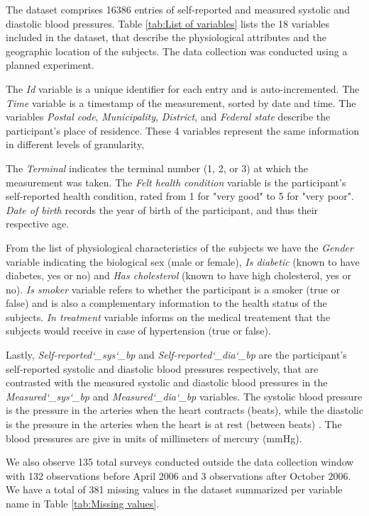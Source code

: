 \documentclass[12 pt]{scrartcl}
\numberwithin{equation}{section}
\begin{document}
The dataset comprises 16386 entries of self-reported and measured systolic and diastolic blood pressures. 
Table \ref{tab:List of variables} lists the 18 variables included in the dataset,
that describe the physiological attributes and the geographic location of the subjects. 
The data collection was conducted using a planned experiment.

The \textit{Id} variable is a unique identifier for each entry and is auto-incremented.
The \textit{Time} variable is a timestamp of the measurement, sorted by date and time.
The variables \textit{Postal code}, \textit{Municipality}, \textit{District}, and \textit{Federal state} describe the participant's place of residence.
These 4 variables represent the same information in different levels of granularity, 

The \textit{Terminal} indicates the terminal number (1, 2, or 3) at which the measurement was taken.
The \textit{Felt health condition} variable is the participant's self-reported health condition, rated from 1 for "very good" to 5 for "very poor".
\textit{Date of birth} records the year of birth of the participant, and thus their respective age.

From the list of physiological characteristics of the subjects we have the \textit{Gender} variable 
indicating the biological sex (male or female), 
\textit{Is diabetic} (known to have diabetes, yes or no) and \textit{Has cholesterol} (known to have high cholesterol, yes or no).
\textit{Is smoker} variable refers to whether the participant is a smoker (true or false)
and is also a complementary information to the health status of the subjects.
\textit{In treatment} variable informs on the medical treatement that the subjects would receive in case of hypertension (true or false).

Lastly, \textit{Self-reported\char`_sys\char`_bp} and \textit{Self-reported\char`_dia\char`_bp} are the participant's self-reported systolic and diastolic blood pressures respectively,
that are contrasted with the measured systolic and diastolic blood pressures in the \textit{Measured\char`_sys\char`_bp} and \textit{Measured\char`_dia\char`_bp} variables.
The systolic blood pressure is the pressure in the arteries when the heart contracts (beats), 
while the diastolic is the pressure in the arteries when the heart is at rest (between beats) \citep{flint2019effect}.
The blood pressures are give in units of millimeters of mercury (mmHg).

We also observe 135 total surveys conducted outside the data collection window with 132 observations before April 2006 and 3 observations after October 2006.
We have a total of 381 missing values in the dataset
summarized per variable name in Table \ref{tab:Missing values}.
\end{document}
